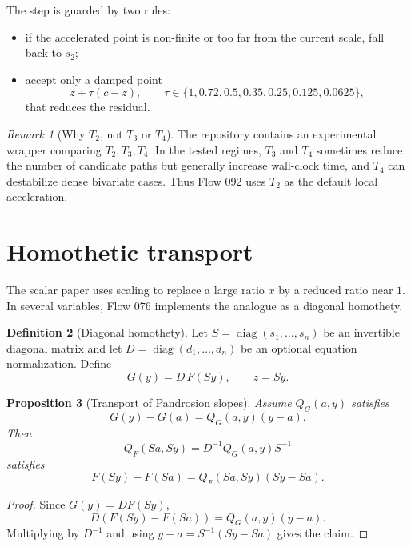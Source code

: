 \documentclass[11pt,a4paper]{article}
\theoremstyle{definition}
\newtheorem{definition}{Definition}[section]
\theoremstyle{plain}
\newtheorem{proposition}[definition]{Proposition}
\theoremstyle{remark}
\newtheorem{remark}[definition]{Remark}
\newcommand{\diag}{\operatorname{diag}}
\begin{document}
The step is guarded by two rules:
\begin{itemize}[leftmargin=2em]
  \item if the accelerated point is non-finite or too far from the current
  scale, fall back to \(s_2\);
  \item accept only a damped point
  \[
    z+\tau(c-z),\qquad
    \tau\in\{1,0.72,0.5,0.35,0.25,0.125,0.0625\},
  \]
  that reduces the residual.
\end{itemize}

\begin{remark}[Why \(T_2\), not \(T_3\) or \(T_4\)]
The repository contains an experimental wrapper comparing \(T_2,T_3,T_4\).  In
the tested regimes, \(T_3\) and \(T_4\) sometimes reduce the number of candidate
paths but generally increase wall-clock time, and \(T_4\) can destabilize dense
bivariate cases.  Thus Flow 092 uses \(T_2\) as the default local acceleration.
\end{remark}

\section{Homothetic transport}

The scalar paper uses scaling to replace a large ratio \(x\) by a reduced ratio
near \(1\).  In several variables, Flow 076 implements the analogue as a
diagonal homothety.

\begin{definition}[Diagonal homothety]
Let \(S=\diag(s_1,\ldots,s_n)\) be an invertible diagonal matrix and let
\(D=\diag(d_1,\ldots,d_n)\) be an optional equation normalization.  Define
\[
  G(y)=D\,F(Sy),
  \qquad z=Sy.
\]
\end{definition}

\begin{proposition}[Transport of Pandrosion slopes]
\label{prop:transport}
Assume \(Q_G(a,y)\) satisfies
\[
  G(y)-G(a)=Q_G(a,y)(y-a).
\]
Then
\[
  Q_F(Sa,Sy)=D^{-1}Q_G(a,y)S^{-1}
\]
satisfies
\[
  F(Sy)-F(Sa)=Q_F(Sa,Sy)(Sy-Sa).
\]
\end{proposition}

\begin{proof}
Since \(G(y)=DF(Sy)\),
\[
  D(F(Sy)-F(Sa))=Q_G(a,y)(y-a).
\]
Multiplying by \(D^{-1}\) and using \(y-a=S^{-1}(Sy-Sa)\) gives the claim.
\end{proof}
\end{document}
